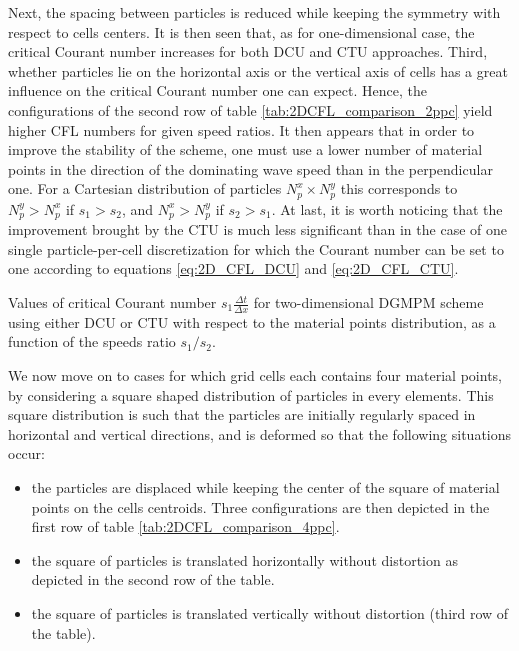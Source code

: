 Next, the spacing between particles is reduced while keeping the symmetry with respect to cells centers.
It is then seen that, as for one-dimensional case, the critical Courant number increases for both DCU and CTU approaches.
Third, whether particles lie on the horizontal axis or the vertical axis of cells has a great influence on the critical Courant number one can expect.
Hence, the configurations of the second row of table \ref{tab:2DCFL_comparison_2ppc} yield higher CFL numbers for given speed ratios.
It then appears that in order to improve the stability of the scheme, one must use a lower number of material points in the direction of the dominating wave speed than in the perpendicular one.
For a Cartesian distribution of particles $N_p^x \times N_p^y$ this corresponds to $N_p^y > N_p^x$ if $s_1>s_2$, and $N_p^x > N_p^y$ if $s_2>s_1$.
At last, it is worth noticing that the improvement brought by the CTU is much less significant than in the case of one single particle-per-cell discretization for which the Courant number can be set to one according to equations \eqref{eq:2D_CFL_DCU} and \eqref{eq:2D_CFL_CTU}.

\begin{table}[h!]
  \centering
  
  \caption{Values of critical Courant number $s_1\frac{\Delta t}{\Delta x}$ for two-dimensional DGMPM scheme using either DCU or CTU with respect to the material points distribution, as a function of the speeds ratio $s_1/s_2$.}
  \label{tab:2DCFL_comparison_4ppc}
\end{table}
We now move on to cases for which grid cells each contains four material points, by considering a square shaped distribution of particles in every elements. %
This square distribution is such that the particles are initially regularly spaced in horizontal and vertical directions, and is deformed so that the following situations occur:
\begin{itemize}
\item the particles are displaced while keeping the center of the square of material points on the cells centroids.
  Three configurations are then depicted in the first row of table \ref{tab:2DCFL_comparison_4ppc}.
\item the square of particles is translated horizontally without distortion as depicted in the second row of the table.
\item the square of particles is translated vertically without distortion (third row of the table).
\end{itemize}

